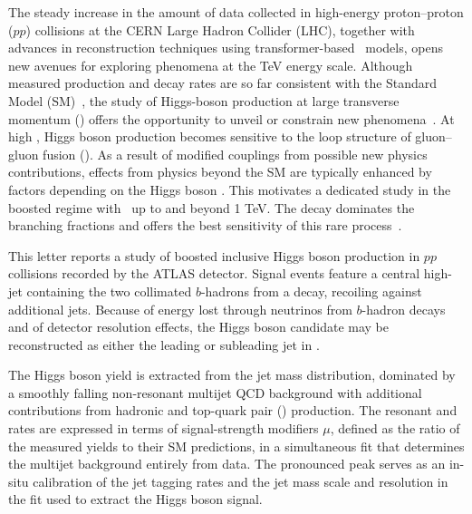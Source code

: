 \documentclass[PAPER, cernpreprint=true, atlasdraft=false, UKenglish, texmf, orcidlogo]{atlasdoc}
\begin{document}
\maketitle











The steady increase in the amount of data collected in high-energy proton--proton ($pp$) collisions at the CERN Large Hadron Collider (LHC), together with advances in reconstruction techniques using transformer-based~\cite{VaswaniAttention,ATL-PHYS-PUB-2023-021,ATL-PHYS-PUB-2024-015} models, opens new avenues for exploring phenomena at the TeV energy scale.
Although measured production and decay rates are so far consistent with the Standard Model (SM)~\cite{HIGG-2021-23,CMS-HIG-22-001}, the study of Higgs-boson production at large transverse momentum (\pT) offers the opportunity to unveil or constrain new phenomena~\cite{Grojean:2013nya, Dawson:2015gka, Grazzini:2016paz, Banfi:2018pki}. At high \pT, Higgs boson production becomes sensitive to the loop structure of gluon--gluon fusion (\ggF). As a result of modified couplings from possible new physics contributions, effects from physics beyond the SM are typically enhanced by factors depending on the Higgs boson \pT. This motivates a dedicated study in the boosted regime with \pT\ up to and beyond 1 TeV. The \Hbb decay dominates the branching fractions and offers the best sensitivity of this rare process~\cite{CMS-HIG-17-010,HIGG-2018-52,HIGG-2021-08,HIGG-2021-11,CMS-HIG-21-020}.

This letter reports a study of boosted inclusive Higgs boson production in $pp$ collisions recorded by the ATLAS detector.
Signal events feature a central high-\pT jet containing the two collimated $b$-hadrons from a \Hbb decay, recoiling against additional jets.
Because of energy lost through neutrinos from $b$-hadron decays and of detector resolution effects, the Higgs boson candidate may be reconstructed as either the leading or subleading jet in \pT.

The Higgs boson yield is extracted from the jet mass \mJ distribution, dominated by a smoothly falling non-resonant multijet QCD background with additional contributions from hadronic \Vjets and top-quark pair (\ttbar) production.
The resonant \Zbb and \Hbb rates are expressed in terms of signal-strength modifiers $\mu$, defined as the ratio of the measured yields to their SM predictions, in a simultaneous fit that determines the multijet background entirely from data.
The pronounced \Zbb peak serves as an in-situ calibration of the jet tagging rates and the jet mass scale and resolution in the fit used to extract the Higgs boson signal.
\end{document}
